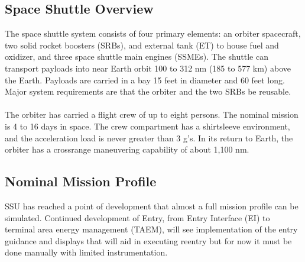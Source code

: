 \documentclass[13pt, letter,final]{article}
\begin{document}
\begin{multicols}{2}

\subsection*{\large Space Shuttle Overview}
The space shuttle system consists of four primary elements: an orbiter spacecraft, two solid rocket boosters (SRBs), and external tank (ET) to house fuel and oxidizer, and three space shuttle main engines (SSMEs). The shuttle can transport payloads into near Earth orbit 100 to 312 nm (185 to 577 km) above the Earth. Payloads are carried in a bay 15 feet in diameter and 60 feet long. Major system requirements are that the orbiter and the two SRBs be reusable.\\
\\
The orbiter has carried a flight crew of up to eight persons. The nominal mission is 4 to 16 days in space. The crew compartment has a shirtsleeve environment, and the acceleration load is never greater than 3 g's. In its return to Earth, the orbiter has a crossrange maneuvering capability of about 1,100 nm.\\

\subsection*{\large Nominal Mission Profile}
SSU has reached a point of development that almost a full mission profile can be simulated. Continued development of Entry, from Entry Interface (EI) to terminal area energy management (TAEM), will see implementation of the entry guidance and displays that will aid in executing reentry but for now it must be done manually with limited instrumentation.\\
\\
\begin{center}

\end{center}
\end{multicols}
\end{document}
